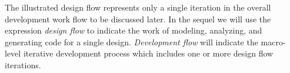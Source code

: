 The illustrated design flow represents only a single iteration in 
the overall development work flow to be discussed later.  
In the sequel we will use the 
expression \emph{design flow} to indicate the work of modeling,
analyzing, and generating code for a single design.  \emph{Development flow}
will indicate the macro-level iterative development process
which includes one or more design flow iterations.

